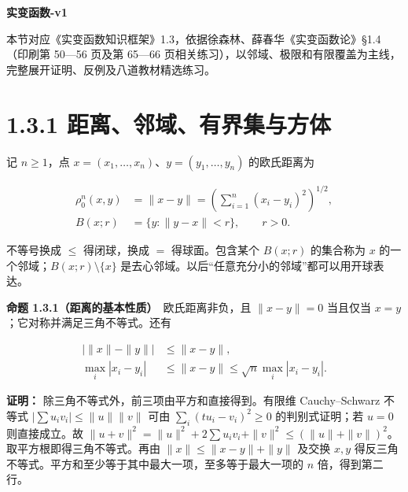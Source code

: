 \documentclass[11pt,a4paper]{article}
\begin{document}
\begin{center}
{\Large\bfseries 实变函数-v1\par}
\vspace{5pt}{第一章 集合与点集\par}
\end{center}
本节对应《实变函数知识框架》1.3，依据徐森林、薛春华《实变函数论》\S1.4（印刷第 50—56 页及第 65—66 页相关练习），以邻域、极限和有限覆盖为主线，完整展开证明、反例及八道教材精选练习。
\begingroup\setlength{\parskip}{0pt}\tableofcontents\endgroup

\section[\S{}1.3.1
距离、邻域、有界集与方体]{1.3.1
距离、邻域、有界集与方体}\label{ux8dddux79bbux90bbux57dfux6709ux754cux96c6ux4e0eux65b9ux4f53}

记 \(n\geq1\)，点 \(x=(x_1,\ldots,x_n)\)、\(y=(y_1,\ldots,y_n)\)
的欧氏距离为

\begin{equation*}
\begin{aligned}
\rho_0^n(x,y)&=\|x-y\|=\left(\sum_{i=1}^n(x_i-y_i)^2\right)^{1/2},\\
B(x;r)&=\{y:\|y-x\|<r\},\qquad r>0.
\end{aligned}\tag{1.3.1}
\end{equation*}

不等号换成 \(\leq\) 得闭球，换成 \(=\) 得球面。包含某个 \(B(x;r)\)
的集合称为 \(x\) 的一个邻域；\(B(x;r)\setminus\{x\}\)
是去心邻域。以后``任意充分小的邻域''都可以用开球表达。

\textbf{命题 1.3.1（距离的基本性质）}　欧氏距离非负，且 \(\|x-y\|=0\)
当且仅当 \(x=y\)；它对称并满足三角不等式。还有

\begin{equation*}
\begin{aligned}
\bigl|\|x\|-\|y\|\bigr|&\leq\|x-y\|,\\
\max_i|x_i-y_i|&\leq\|x-y\|\leq\sqrt n\max_i|x_i-y_i|.
\end{aligned}\tag{1.3.2}
\end{equation*}

\textbf{证明：} 除三角不等式外，前三项由平方和直接得到。有限维
Cauchy--Schwarz 不等式 \(|\sum u_iv_i|\leq\|u\|\|v\|\) 可由
\(\sum_i(tu_i-v_i)^2\geq0\) 的判别式证明；若 \(u=0\) 则直接成立。故
\(\|u+v\|^2=\|u\|^2+2\sum u_iv_i+\|v\|^2\leq(\|u\|+\|v\|)^2\)。取平方根即得三角不等式。再由
\(\|x\|\leq\|x-y\|+\|y\|\) 及交换 \(x,y\)
得反三角不等式。平方和至少等于其中最大一项，至多等于最大一项的 \(n\)
倍，得到第二行。
\end{document}
